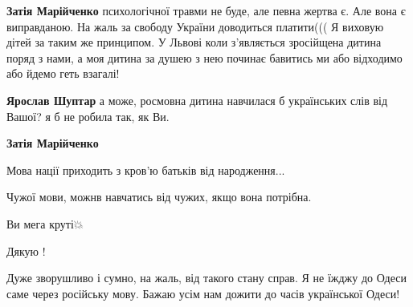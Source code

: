 \begin{itemize}
\begin{itemize}
\textbf{Затія Марійченко} психологічної травми не буде, але певна жертва є. Але вона є виправданою. На жаль за свободу України доводиться платити(((
Я виховую дітей за таким же принципом. У Львові коли з'являється зросійщена дитина поряд з нами, а моя дитина за душею з нею починає бавитись ми або відходимо або йдемо геть взагалі!

 
\textbf{Ярослав Шуптар} а може, росмовна дитина навчилася б українських слів від Вашої? я б не робила так, як Ви.

 
\textbf{Затія Марійченко}

Мова нації приходить з кров'ю батьків від народження...

Чужої мови, можнв навчатись від чужих, якщо вона потрібна.

\end{itemize}

 
Ви мега круті💥

 
Дякую \Smiley[1.0][yellow]!

 

Дуже зворушливо і сумно, на жаль, від такого стану справ. Я не їжджу до Одеси
саме через російську мову. Бажаю усім нам дожити до часів української Одеси!


\end{itemize}
